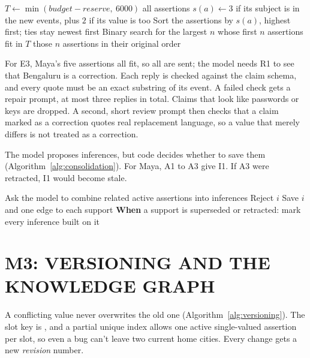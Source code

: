 \begin{algorithm}[!htbp]
\caption{Priority-based context selection}
\label{alg:context}
\begin{algorithmic}[1]
\State $T \gets \min(\mathit{budget} - \mathit{reserve},\ 6000)$
  \State \Return all assertions
\EndIf
{}
  \State $s(a) \gets 3$ if its subject is in the new events, plus $2$ if its value is too
\EndFor
\State Sort the assertions by $s(a)$, highest first; ties stay newest first
\State Binary search for the largest $n$ whose first $n$ assertions fit in $T$
\State \Return those $n$ assertions in their original order
\end{algorithmic}
\end{algorithm}

For E3, Maya's five assertions all fit, so all are sent; the model needs R1 to see that
Bengaluru is a correction. Each reply is checked against the claim schema, and every quote must
be an exact substring of its event. A failed check gets a repair prompt, at most three replies in
total. Claims that look like passwords or keys are dropped. A second, short review prompt then checks
that a claim marked as a correction quotes real replacement language, so a value that merely differs
is not treated as a correction.

The model proposes inferences, but code decides whether to save them
(Algorithm~\ref{alg:consolidation}). For Maya, A1 to A3 give I1. If A3 were retracted, I1 would
become stale.

\begin{algorithm}[!htbp]
\caption{Memory consolidation and invalidation}
\label{alg:consolidation}
\begin{algorithmic}[1]
\State Ask the model to combine related active assertions into inferences
    \State Reject $i$
    \State Save $i$ and one  edge to each support
  \EndIf
\EndFor
\State \textbf{When} a support is superseded or retracted: mark every inference built on it 
\end{algorithmic}
\end{algorithm}

\section{\uppercase{M3: Versioning and the Knowledge Graph}}
\label{sec:m3-impl}
A conflicting value never overwrites the old one (Algorithm~\ref{alg:versioning}). The slot key
is , and a partial unique index allows one active
single-valued assertion per slot, so even a bug can't leave two current home cities. Every change
gets a new \emph{revision} number.

